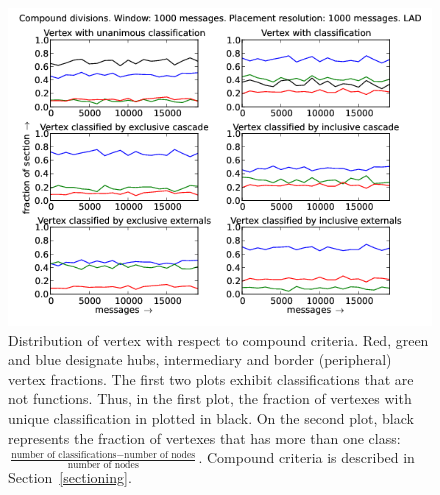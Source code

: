 \documentclass[%
 aip,
 jmp,%
 amsmath,amssymb,
 reprint,%
]{revtex4-1}
\begin{document}
\begin{figure}[hbtp] 
   \centering
        \includegraphics[width=\textwidth]{figs/LAD/1000_2}
    \caption{Distribution of vertex with respect to compound criteria. Red, green and blue designate hubs, intermediary and border (peripheral) vertex fractions. The first two plots exhibit classifications that are not functions. Thus, in the first plot, the fraction of vertexes with unique classification in plotted in black. On the second plot, black represents the fraction of vertexes that has more than one class: $\frac{\text{number of classifications} - \text{number of nodes}}{\text{number of nodes}}$. Compound criteria is described in Section~\ref{sectioning}.}
    \label{fig:lad1000_}
\end{figure}
\end{document}
